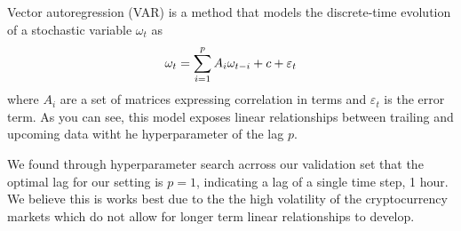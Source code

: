 Vector autoregression (VAR) is a method that models the discrete-time evolution of a stochastic variable $\omega_{t}$ as 
\[
\omega_{t}=\sum_{i=1}^{p} A_{i}\omega_{t-i}+c+\varepsilon_{t}\\
\]
where $A_{i}$ are a set of matrices expressing correlation in terms and $\varepsilon_{t}$ is the error term. As you can see, this model exposes linear relationships between trailing and upcoming data witht he hyperparameter of the lag $p$. 

We found through hyperparameter search acrross our validation set that the optimal lag for our setting is $p=1$, indicating a lag of a single time step, 1 hour. We believe this is works best due to the the high volatility of the cryptocurrency markets which do not allow for longer term linear relationships to develop. 